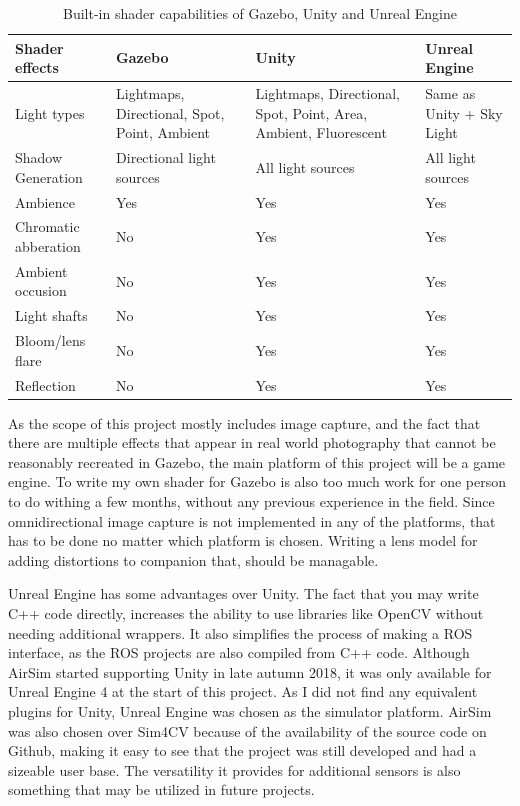 \begin{table}[!htb]
    \centering
    \begin{tabular}{|>{\centering\arraybackslash}m{3cm}|>{\centering\arraybackslash}m{3.5cm}|>{\centering\arraybackslash}m{4cm}|>{\centering\arraybackslash}m{3.5cm}|} \hline
        \textbf{Shader effects} & \textbf{Gazebo} & \textbf{Unity} & \textbf{Unreal Engine} \\ \hline\hline
        Light types     & Lightmaps, Directional, Spot, Point, Ambient & Lightmaps, Directional, Spot, Point, Area, Ambient, Fluorescent & Same as Unity + Sky Light \\ \hline
        Shadow Generation & Directional light sources & All light sources & All light sources \\ \hline
        Ambience        & Yes & Yes & Yes \\ \hline
        Chromatic abberation & No & Yes & Yes \\ \hline
        Ambient occusion & No & Yes & Yes \\ \hline
        Light shafts    & No & Yes & Yes \\ \hline
        Bloom/lens flare & No & Yes & Yes \\ \hline
        Reflection      & No & Yes & Yes \\ \hline
    \end{tabular}
    \caption{Built-in shader capabilities of Gazebo, Unity and Unreal Engine}
    \label{tab:comparison_shader}
\end{table}

As the scope of this project mostly includes image capture, and the fact that there are multiple effects that appear in real world photography that cannot be reasonably recreated in Gazebo, the main platform of this project will be a game engine. To write my own shader for Gazebo is also too much work for one person to do withing a few months, without any previous experience in the field. Since omnidirectional image capture is not implemented in any of the platforms, that has to be done no matter which platform is chosen. Writing a lens model for adding distortions to companion that, should be managable.

Unreal Engine has some advantages over Unity. The fact that you may write C++ code directly, increases the ability to use libraries like OpenCV without needing additional wrappers. It also simplifies the process of making a ROS interface, as the ROS projects are also compiled from C++ code. Although AirSim started supporting Unity in late autumn 2018, it was only available for Unreal Engine 4 at the start of this project. As I did not find any equivalent plugins for Unity, Unreal Engine was chosen as the simulator platform. AirSim was also chosen over Sim4CV because of the availability of the source code on Github, making it easy to see that the project was still developed and had a sizeable user base. The versatility it provides for additional sensors is also something that may be utilized in future projects.

